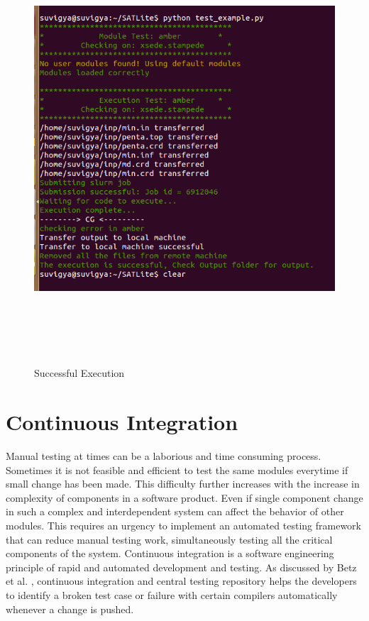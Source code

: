 \documentclass[10pt]{ruthesis}
\begin{document}
\begin{figure}
  \begin{center}
  \includegraphics[width=15cm,height=16cm]{success.png}
  \caption{Successful Execution}
  \label{fig:success}
  \end{center}
\end{figure}


\chapter{Continuous Integration}
Manual testing at times can be a laborious and time consuming process. Sometimes it is not feasible and efficient to test the same modules everytime if small change has been made. This difficulty further increases with the increase in complexity of components in a software product. Even if single component change in such a complex and interdependent system can affect the behavior of other modules. This requires an urgency to implement an automated testing framework that can reduce manual testing work, simultaneously testing all the critical components of the system. Continuous integration is a software engineering principle of rapid and automated development and testing. As discussed by Betz et al. \cite{ref16}, continuous integration and central testing repository helps the developers to identify a broken test case or failure with certain compilers automatically whenever a change is pushed.
\end{document}

